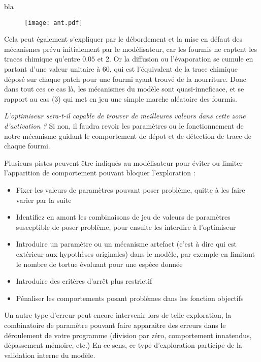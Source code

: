 \begin{framewithtitle}[bla]{bla}
\begin{figure}[H]
	 \centering
	 	\texttt{[image: ant.pdf]}
\end{figure}

Cela peut également s'expliquer par le débordement et la mise en défaut des mécanismes prévu initialement par le modélisateur, car les fourmis ne captent les traces chimique qu'entre $0.05$ et $2$. Or la diffusion ou l'évaporation se cumule en partant d'une valeur unitaire à $60$, qui est l'équivalent de la trace chimique déposé sur chaque patch pour une fourmi ayant trouvé de la nourriture. Donc dans tout ces ce cas là, les mécanismes du modèle sont quasi-inneficace, et se rapport au cas (3) qui met en jeu une simple marche aléatoire des fourmis.

\textit{L'optimiseur sera-t-il capable de trouver de meilleures valeurs dans cette zone d'activation ?} Si non, il faudra revoir les paramètres ou le fonctionnement de notre mécanisme guidant le comportement de dépot et de détection de trace de chaque fourmi.

Plusieurs pistes peuvent être indiqués au modélisateur pour éviter ou limiter l'apparition de comportement pouvant bloquer l'exploration :

\begin{itemize}[noitemsep,nolistsep]
	\item Fixer les valeurs de paramètres pouvant poser problème, quitte à les faire varier par la suite
	\item Identifiez en amont les combinaisons de jeu de valeurs de paramètres susceptible de poser problème, pour ensuite les interdire à l'optimiseur
	\item Introduire un paramètre ou un mécanisme artefact (c'est à dire qui est extérieur aux hypothèses originales) dans le modèle, par exemple en limitant le nombre de tortue évoluant pour une espèce donnée
	\item Introduire des critères d'arrêt plus restrictif 
	\item Pénaliser les comportements posant problèmes dans les fonction objectifs
\end{itemize}

Un autre type d'erreur peut encore intervenir lors de telle exploration, la combinatoire de paramètre pouvant faire apparaitre des erreurs dans le déroulement de votre programme (division par zéro, comportement innatendus, dépassement mémoire, etc.) En ce sens, ce type d'exploration participe de la validation interne du modèle.

\end{framewithtitle}

